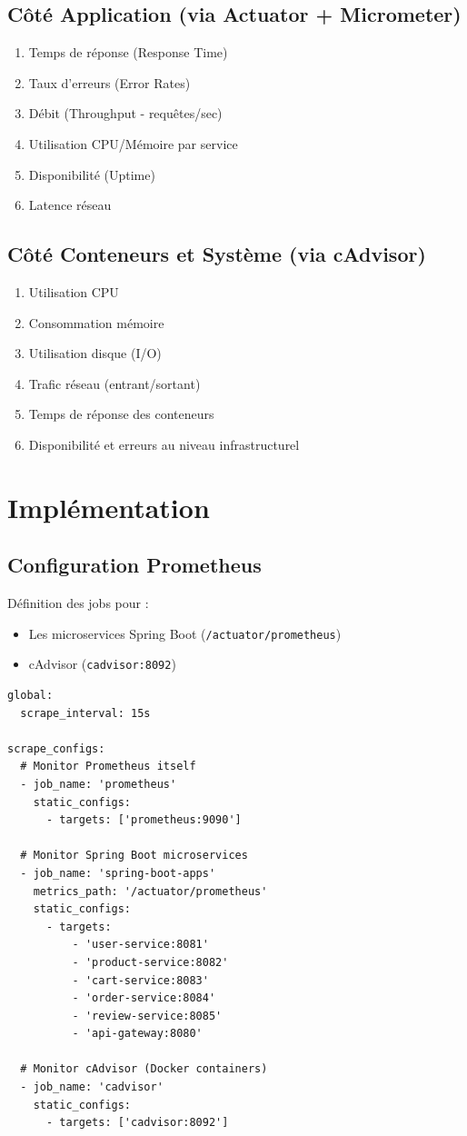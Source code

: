 \subsection{Côté Application (via Actuator + Micrometer)}
\begin{enumerate}
    \item  Temps de réponse (Response Time)
    \item  Taux d’erreurs (Error Rates)
    \item  Débit (Throughput - requêtes/sec)
    \item  Utilisation CPU/Mémoire par service
    \item  Disponibilité (Uptime)
    \item  Latence réseau
\end{enumerate}

\subsection{Côté Conteneurs et Système (via cAdvisor)}
\begin{enumerate}
    \item  Utilisation CPU
    \item  Consommation mémoire
    \item  Utilisation disque (I/O)
    \item  Trafic réseau (entrant/sortant)
    \item  Temps de réponse des conteneurs
    \item  Disponibilité et erreurs au niveau infrastructurel
\end{enumerate}

\section{Implémentation}

\subsection{Configuration Prometheus}
Définition des jobs pour :
\begin{itemize}
    \item Les microservices Spring Boot (\texttt{/actuator/prometheus})
    \item cAdvisor (\texttt{cadvisor:8092})
\end{itemize}
\begin{verbatim}
global:
  scrape_interval: 15s

scrape_configs:
  # Monitor Prometheus itself
  - job_name: 'prometheus'
    static_configs:
      - targets: ['prometheus:9090']

  # Monitor Spring Boot microservices
  - job_name: 'spring-boot-apps'
    metrics_path: '/actuator/prometheus'
    static_configs:
      - targets:
          - 'user-service:8081'
          - 'product-service:8082'
          - 'cart-service:8083'
          - 'order-service:8084'
          - 'review-service:8085'
          - 'api-gateway:8080'

  # Monitor cAdvisor (Docker containers)
  - job_name: 'cadvisor'
    static_configs:
      - targets: ['cadvisor:8092']
\end{verbatim}
